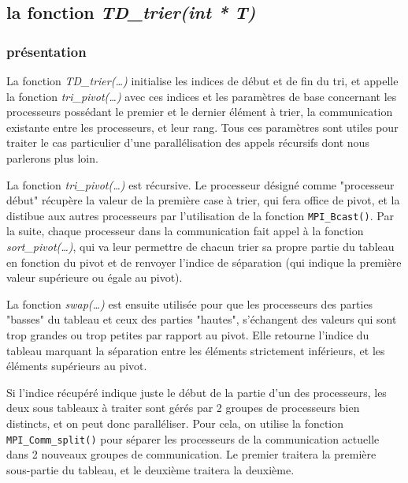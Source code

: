\subsection*{la fonction \textit{TD\_trier(int * T)}}
\subsubsection*{présentation}

La fonction \textit{TD\_trier(\dots)} initialise les indices de début et de fin du tri, et appelle la fonction \textit{tri\_pivot(\dots)} avec ces indices et les paramètres de base concernant les processeurs possédant le premier et le dernier élément à trier, la communication existante entre les processeurs, et leur rang. Tous ces paramètres sont utiles pour traiter le cas particulier d'une parallélisation des appels récursifs dont nous parlerons plus loin.



La fonction \textit{tri\_pivot(\dots)} est récursive. Le processeur désigné comme "processeur début" récupère la valeur de la première case à trier, qui fera office de pivot, et la distibue aux autres processeurs par l'utilisation de la fonction \verb+MPI_Bcast()+.
Par la suite, chaque processeur dans la communication fait appel à la fonction \textit{sort\_pivot(\dots)}, qui va leur permettre de chacun trier sa propre partie du tableau en fonction du pivot et de renvoyer l'indice de séparation (qui indique la première valeur supérieure ou égale au pivot).



La fonction \textit{swap(\dots)} est ensuite utilisée pour que les processeurs des parties "basses" du tableau et ceux des parties "hautes", s'échangent des valeurs qui sont trop grandes ou trop petites par rapport au pivot. Elle retourne l'indice du tableau marquant la séparation entre les éléments strictement inférieurs, et les éléments supérieurs au pivot.



Si l'indice récupéré indique juste le début de la partie d'un des processeurs, les deux sous tableaux à traiter sont gérés par 2 groupes de processeurs bien distincts, et on peut donc paralléliser.
Pour cela, on utilise la fonction \verb+MPI_Comm_split()+ pour séparer les processeurs de la communication actuelle dans 2 nouveaux groupes de communication. Le premier traitera la première sous-partie du tableau, et le deuxième traitera la deuxième. 

